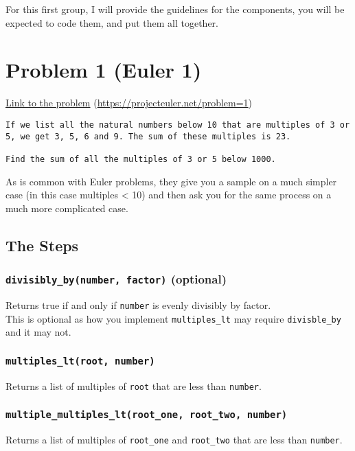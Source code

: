 \documentclass[11pt]{article}
\begin{document}
For this first group, I will provide the guidelines for the components, you will be expected to code them, and put them all together.\\
\section{Problem 1 (Euler 1)}
\label{sec:org2e6bd4a}
\href{https://projecteuler.net/problem=1}{Link to the problem} (\url{https://projecteuler.net/problem=1})\\

\begin{verbatim}
If we list all the natural numbers below 10 that are multiples of 3 or 5, we get 3, 5, 6 and 9. The sum of these multiples is 23.

Find the sum of all the multiples of 3 or 5 below 1000.
\end{verbatim}

As is common with Euler problems, they give you a sample on a much simpler case (in this case multiples < 10) and then ask you for the same process on a much more complicated case.\\

\subsection{The Steps}
\label{sec:org487810e}
\subsubsection{\texttt{divisibly\_by(number, factor)} (optional)}
\label{sec:org26fec98}
Returns true if and only if \texttt{number} is evenly divisibly by factor.\\

This is optional as how you implement \texttt{multiples\_lt} may require \texttt{divisble\_by} and it may not.\\
\subsubsection{\texttt{multiples\_lt(root, number)}}
\label{sec:orgbbb9148}
Returns a list of multiples of \texttt{root} that are less than \texttt{number}.\\
\subsubsection{\texttt{multiple\_multiples\_lt(root\_one, root\_two, number)}}
\label{sec:orgee837b2}
Returns a list of multiples of \texttt{root\_one} and \texttt{root\_two} that are less than \texttt{number}.\\
\end{document}
